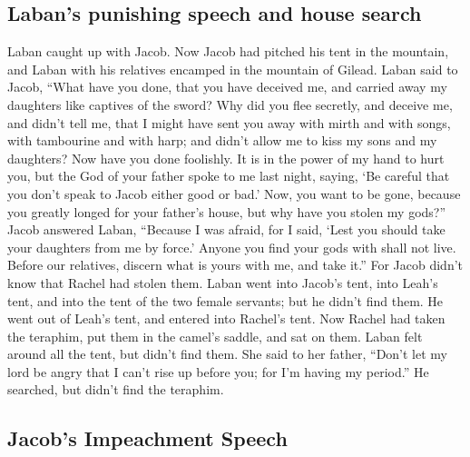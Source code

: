 \hypertarget{labans-punishing-speech-and-house-search}{%
\subsection{Laban's punishing speech and house
search}\label{labans-punishing-speech-and-house-search}}

 Laban caught up with Jacob. Now Jacob had pitched his
tent in the mountain, and Laban with his relatives encamped in the
mountain of Gilead.  Laban said to Jacob, ``What have you
done, that you have deceived me, and carried away my daughters like
captives of the sword?  Why did you flee secretly, and
deceive me, and didn't tell me, that I might have sent you away with
mirth and with songs, with tambourine and with harp;  and
didn't allow me to kiss my sons and my daughters? Now have you done
foolishly.  It is in the power of my hand to hurt you,
but the God of your father spoke to me last night, saying, `Be careful
that you don't speak to Jacob either good or bad.'  Now,
you want to be gone, because you greatly longed for your father's house,
but why have you stolen my gods?''  Jacob answered Laban,
``Because I was afraid, for I said, `Lest you should take your daughters
from me by force.'  Anyone you find your gods with shall
not live. Before our relatives, discern what is yours with me, and take
it.'' For Jacob didn't know that Rachel had stolen them. 
Laban went into Jacob's tent, into Leah's tent, and into the tent of the
two female servants; but he didn't find them. He went out of Leah's
tent, and entered into Rachel's tent.  Now Rachel had
taken the teraphim, put them in the camel's saddle, and sat on them.
Laban felt around all the tent, but didn't find them. 
She said to her father, ``Don't let my lord be angry that I can't rise
up before you; for I'm having my period.'' He searched, but didn't find
the teraphim.

\hypertarget{jacobs-impeachment-speech}{%
\subsection{Jacob's Impeachment
Speech}\label{jacobs-impeachment-speech}}

